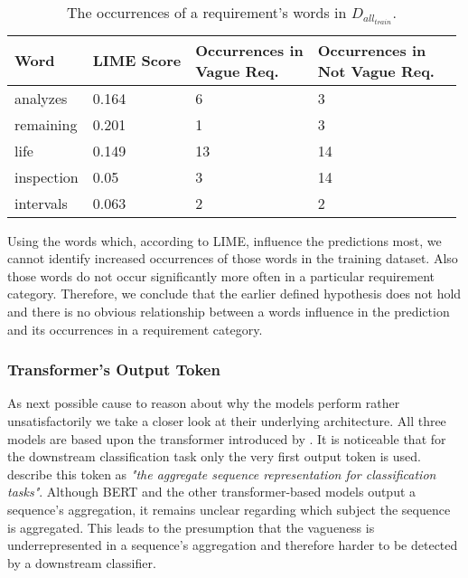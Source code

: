 \begin{table}[htpb]
    \centering
    \begin{tabular}{l | l l l l }
        \toprule
         Word & \ac{LIME} Score & \makecell{Occurrences in\\Vague Req.} & \makecell{Occurrences in\\Not Vague Req.} \\
        \hline
        analyzes & 0.164 & 6 & 3 \\
        remaining & 0.201 & 1 & 3  \\
        life & 0.149 & 13 & 14\\
        inspection & 0.05 & 3 & 14 \\
        intervals & 0.063 & 2 & 2 \\
        \bottomrule
    \end{tabular}
    \caption[Study Interpretation: Word Occurrences]{The occurrences of a requirement's words in $D_{all_{train}}$.}\label{tab:study:interpretation:LIME}
\end{table}

Using the words which, according to \ac{LIME}, influence the predictions most, we cannot identify increased occurrences of those words in the training dataset.
Also those words do not occur significantly more often in a particular requirement category.
Therefore, we conclude that the earlier defined hypothesis does not hold and there is no obvious relationship between a words influence in the prediction and its occurrences in a requirement category.

\subsubsection{Transformer's Output Token}
\label{chp:study:sec:interpretation:subsec:causes:transformer_ouput_token}
As next possible cause to reason about why the models perform rather unsatisfactorily we take a closer look at their underlying architecture.
All three models are based upon the transformer introduced by \textcite{Vaswani:2017}.
It is noticeable that for the downstream classification task only the very first output token is used.
\Textcite{Devlin:2018} describe this token as \textit{"the aggregate sequence representation for classification tasks"}.
Although \ac{BERT} and the other transformer-based models output a sequence's aggregation, it remains unclear regarding which subject the sequence is aggregated.
This leads to the presumption that the vagueness is underrepresented in a sequence's aggregation and therefore harder to be detected by a downstream classifier.

